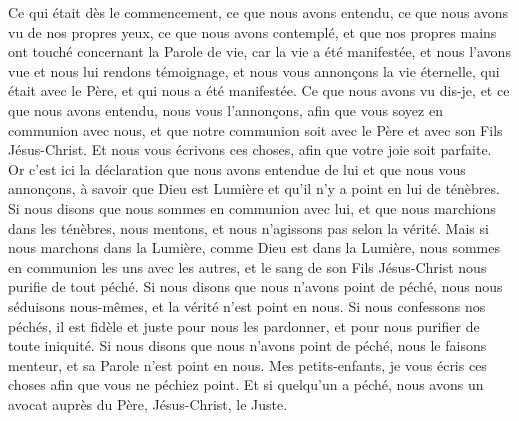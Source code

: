 \begin{multicols}{2}
\VerseOne{}Ce qui était dès le commencement, ce que nous avons entendu, ce que nous avons vu de nos propres yeux, ce que nous avons contemplé, et que nos propres mains ont touché concernant la Parole de vie,
car la vie a été manifestée, et nous l'avons vue et nous lui rendons témoignage, et nous vous annonçons la vie éternelle, qui était avec le Père, et qui nous a été manifestée.
Ce que nous avons vu dis-je, et ce que nous avons entendu, nous vous l'annonçons, afin que vous soyez en communion avec nous, et que notre communion soit avec le Père et avec son Fils Jésus-Christ.
Et nous vous écrivons ces choses, afin que votre joie soit parfaite.
Or c'est ici la déclaration que nous avons entendue de lui et que nous vous annonçons, à savoir que Dieu est Lumière et qu'il n'y a point en lui de ténèbres.
Si nous disons que nous sommes en communion avec lui, et que nous marchions dans les ténèbres, nous mentons, et nous n'agissons pas selon la vérité.
Mais si nous marchons dans la Lumière, comme Dieu est dans la Lumière, nous sommes en communion les uns avec les autres, et le sang de son Fils Jésus-Christ nous purifie de tout péché.
Si nous disons que nous n'avons point de péché, nous nous séduisons nous-mêmes, et la vérité n'est point en nous.
Si nous confessons nos péchés, il est fidèle et juste pour nous les pardonner, et pour nous purifier de toute iniquité.
Si nous disons que nous n'avons point de péché, nous le faisons menteur, et sa Parole n'est point en nous.
\VerseOne{}Mes petits-enfants, je vous écris ces choses afin que vous ne péchiez point. Et si quelqu'un a péché, nous avons un avocat auprès du Père, Jésus-Christ, le Juste.

\end{multicols}
